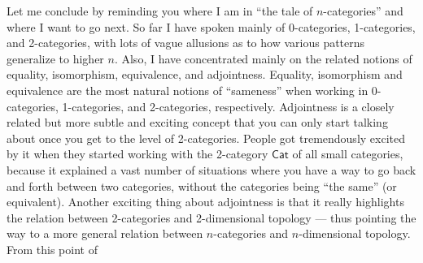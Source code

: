 \documentclass{article}
\begin{document}
Let me conclude by reminding you where I am in ``the tale of
\(n\)-categories'' and where I want to go next. So far I have spoken
mainly of 0-categories, 1-categories, and 2-categories, with lots of
vague allusions as to how various patterns generalize to higher \(n\).
Also, I have concentrated mainly on the related notions of equality,
isomorphism, equivalence, and adjointness. Equality, isomorphism and
equivalence are the most natural notions of ``sameness'' when working in
0-categories, 1-categories, and 2-categories, respectively. Adjointness
is a closely related but more subtle and exciting concept that you can
only start talking about once you get to the level of 2-categories.
People got tremendously excited by it when they started working with the
2-category \(\mathsf{Cat}\) of all small categories, because it
explained a vast number of situations where you have a way to go back
and forth between two categories, without the categories being ``the
same'' (or equivalent). Another exciting thing about adjointness is that
it really highlights the relation between 2-categories and 2-dimensional
topology --- thus pointing the way to a more general relation between
\(n\)-categories and \(n\)-dimensional topology. From this point of
\end{document}
